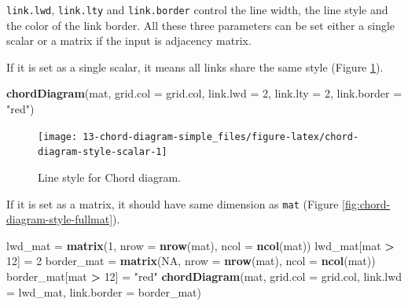 \documentclass[]{book}
\newenvironment{Shaded}{\begin{snugshade}}{\end{snugshade}}
\newcommand{\KeywordTok}[1]{\textcolor[rgb]{0.13,0.29,0.53}{\textbf{#1}}}
\newcommand{\DataTypeTok}[1]{\textcolor[rgb]{0.13,0.29,0.53}{#1}}
\newcommand{\DecValTok}[1]{\textcolor[rgb]{0.00,0.00,0.81}{#1}}
\newcommand{\StringTok}[1]{\textcolor[rgb]{0.31,0.60,0.02}{#1}}
\newcommand{\OtherTok}[1]{\textcolor[rgb]{0.56,0.35,0.01}{#1}}
\newcommand{\OperatorTok}[1]{\textcolor[rgb]{0.81,0.36,0.00}{\textbf{#1}}}
\newcommand{\NormalTok}[1]{#1}
\theoremstyle{definition}
\theoremstyle{definition}
\theoremstyle{remark}
\begin{document}
\texttt{link.lwd}, \texttt{link.lty} and \texttt{link.border} control
the line width, the line style and the color of the link border. All
these three parameters can be set either a single scalar or a matrix if
the input is adjacency matrix.

If it is set as a single scalar, it means all links share the same style
(Figure \ref{fig:chord-diagram-style-scalar}).

\begin{Shaded}
\begin{Highlighting}[]
\KeywordTok{chordDiagram}\NormalTok{(mat, }\DataTypeTok{grid.col =}\NormalTok{ grid.col, }\DataTypeTok{link.lwd =} \DecValTok{2}\NormalTok{, }\DataTypeTok{link.lty =} \DecValTok{2}\NormalTok{, }\DataTypeTok{link.border =} \StringTok{"red"}\NormalTok{)}
\end{Highlighting}
\end{Shaded}

\begin{figure}

{\centering \texttt{[image: 13-chord-diagram-simple\_files/figure-latex/chord-diagram-style-scalar-1]} 

}

\caption{Line style for Chord diagram.}\label{fig:chord-diagram-style-scalar}
\end{figure}

If it is set as a matrix, it should have same dimension as \texttt{mat}
(Figure \ref{fig:chord-diagram-style-fullmat}).

\begin{Shaded}
\begin{Highlighting}[]
\NormalTok{lwd_mat =}\StringTok{ }\KeywordTok{matrix}\NormalTok{(}\DecValTok{1}\NormalTok{, }\DataTypeTok{nrow =} \KeywordTok{nrow}\NormalTok{(mat), }\DataTypeTok{ncol =} \KeywordTok{ncol}\NormalTok{(mat))}
\NormalTok{lwd_mat[mat }\OperatorTok{>}\StringTok{ }\DecValTok{12}\NormalTok{] =}\StringTok{ }\DecValTok{2}
\NormalTok{border_mat =}\StringTok{ }\KeywordTok{matrix}\NormalTok{(}\OtherTok{NA}\NormalTok{, }\DataTypeTok{nrow =} \KeywordTok{nrow}\NormalTok{(mat), }\DataTypeTok{ncol =} \KeywordTok{ncol}\NormalTok{(mat))}
\NormalTok{border_mat[mat }\OperatorTok{>}\StringTok{ }\DecValTok{12}\NormalTok{] =}\StringTok{ "red"}
\KeywordTok{chordDiagram}\NormalTok{(mat, }\DataTypeTok{grid.col =}\NormalTok{ grid.col, }\DataTypeTok{link.lwd =}\NormalTok{ lwd_mat, }\DataTypeTok{link.border =}\NormalTok{ border_mat)}
\end{Highlighting}
\end{Shaded}
\end{document}
